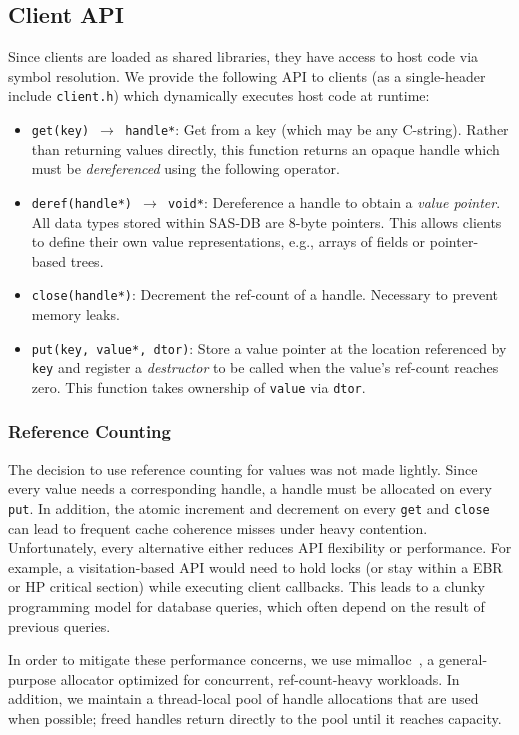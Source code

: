 \subsection{Client API}
Since clients are loaded as shared libraries, they have access to host code via
symbol resolution. We provide the following API to clients (as a single-header
include \texttt{client.h}) which dynamically executes host code at runtime:
\begin{itemize}
    \item \texttt{get(key) $\to$ handle*}: Get from a key (which may be any
    C-string). Rather than returning values directly, this function returns an
    opaque handle which must be \emph{dereferenced} using the following
    operator.
    \item \texttt{deref(handle*) $\to$ void*}: Dereference a handle to obtain a
    \emph{value pointer}. All data types stored within SAS-DB are 8-byte
    pointers. This allows clients to define their own value representations,
    e.g., arrays of fields or pointer-based trees.
    \item \texttt{close(handle*)}: Decrement the ref-count of a handle.
    Necessary to prevent memory leaks.
    \item \texttt{put(key, value*, dtor)}: Store a value pointer at the location
    referenced by \texttt{key} and register a \emph{destructor} to be called
    when the value's ref-count reaches zero. This function takes ownership of
    \texttt{value} via \texttt{dtor}.
\end{itemize}

\subsubsection{Reference Counting}
The decision to use reference counting for values was not made lightly. Since
every value needs a corresponding handle, a handle must be allocated on every
\texttt{put}. In addition, the atomic increment and decrement on every
\texttt{get} and \texttt{close} can lead to frequent cache coherence misses
under heavy contention. Unfortunately, every alternative either reduces API
flexibility or performance. For example, a visitation-based API would need to
hold locks (or stay within a EBR or HP critical section) while executing client
callbacks. This leads to a clunky programming model for database queries, which
often depend on the result of previous queries.

In order to mitigate these performance concerns, we use
mimalloc~\cite{leijen19mimalloc}, a general-purpose allocator optimized for
concurrent, ref-count-heavy workloads. In addition, we maintain a thread-local
pool of handle allocations that are used when possible; freed handles return
directly to the pool until it reaches capacity.

